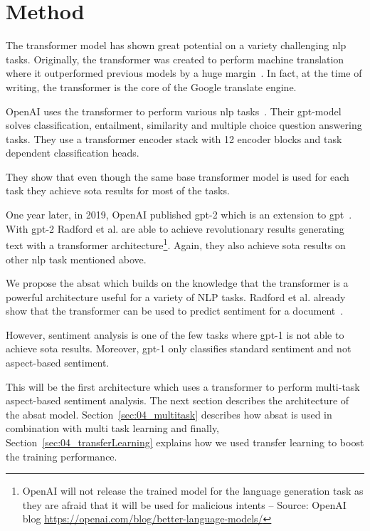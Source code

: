 \chapter{Method}
\label{ch:method}

The transformer model has shown great potential on a variety challenging \gls{nlp} tasks. Originally, the transformer was created to perform machine translation where it outperformed previous models by a huge margin~\cite{Vaswani2017}. In fact, at the time of writing, the transformer is the core of the Google translate engine.
\medskip

OpenAI uses the transformer to perform various \gls{nlp} tasks~\cite{Radford2018}. Their \gls{gpt}-model solves classification, entailment, similarity and multiple choice question answering tasks. They use a transformer encoder stack with 12 encoder blocks and task dependent classification heads. 

They show that even though the same base transformer model is used for each task they achieve \gls{sota} results for most of the tasks.
\medskip

One year later, in 2019, OpenAI published \gls{gpt}-2 which is an extension to \gls{gpt}~\cite{Radford2019}. With \gls{gpt}-2 Radford et al. are able to achieve revolutionary results generating text with a transformer architecture\footnote{OpenAI will not release the trained model for the language generation task as they are afraid that it will be used for malicious intents -- Source: OpenAI blog \url{https://openai.com/blog/better-language-models/}}. Again, they also achieve \gls{sota} results on other \gls{nlp} task mentioned above.
\bigskip

We propose the \acrfull{absat} which builds on the knowledge that the transformer is a powerful architecture useful for a variety of NLP tasks. Radford et al. already show that the transformer can be used to predict sentiment for a document~\cite{Radford2018}. 

However, sentiment analysis is one of the few tasks where \gls{gpt}-1 is not able to achieve \gls{sota} results. Moreover, \gls{gpt}-1 only classifies standard sentiment and not aspect-based sentiment.
\medskip

This will be the first architecture which uses a transformer to perform multi-task aspect-based sentiment analysis. The next section describes the architecture of the \gls{absat} model. Section~\ref{sec:04_multitask} describes how \gls{absat} is used in combination with multi task learning and finally, Section~\ref{sec:04_transferLearning} explains how we used transfer learning to boost the training performance.

